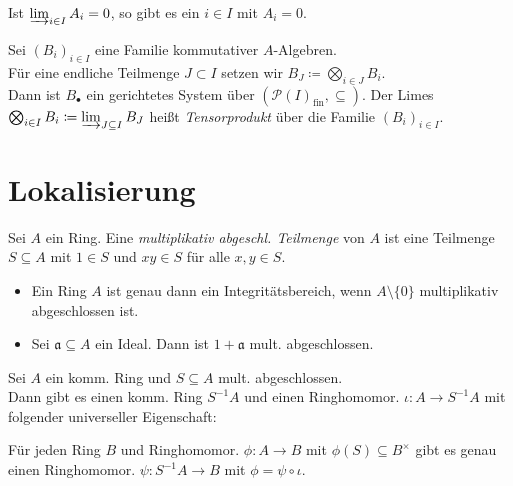 \documentclass{cheat-sheet}
\newcommand{\PS}{\mathcal{P}} %
\newcommand{\aaa}{\mathfrak{a}}
\begin{document}
\begin{prop}
  Ist $\varinjlim_{i \in I} A_i = 0$, so gibt es ein $i \in I$ mit $A_i = 0$.
\end{prop}

\begin{defn}
  Sei $(B_i)_{i \in I}$ eine Familie kommutativer $A$-Algebren. \\
  Für eine endliche Teilmenge $J \subset I$ setzen wir $B_J \coloneqq \bigotimes_{i \in J} B_i$. \\
  Dann ist $B_\bullet$ ein gerichtetes System über $(\PS(I)_{\text{fin}}, \subseteq)$.
  Der Limes $\bigotimes_{i \in I} B_i \coloneqq \varinjlim_{J \subseteq I} B_J$ heißt \emph{Tensorprodukt} über die Familie $(B_i)_{i \in I}$.
\end{defn}

\section{Lokalisierung}



\begin{defn}
  Sei $A$ ein Ring.
  Eine \emph{multiplikativ abgeschl. Teilmenge} von $A$ ist eine Teilmenge $S \subseteq A$ mit $1 \in S$ und $xy \in S$ für alle $x, y \in S$.
\end{defn}

\begin{bspe}
  \begin{itemize}
    \item Ein Ring $A$ ist genau dann ein Integritätsbereich, wenn $A \setminus \{ 0 \}$ multiplikativ abgeschlossen ist.
    \item Sei $\aaa \subseteq A$ ein Ideal. Dann ist $1 + \aaa$ mult. abgeschlossen.
  \end{itemize}
\end{bspe}

\begin{prop}
  Sei $A$ ein komm. Ring und $S \subseteq A$ mult. abgeschlossen. \\
  Dann gibt es einen komm. Ring $S^{-1} A$ und einen Ringhomomor. $\iota : A \to S^{-1} A$ mit folgender universeller Eigenschaft:
  
  \hfill\begin{minipage}{0.95 \linewidth}
    Für jeden Ring $B$ und Ringhomomor. $\phi : A \to B$ mit $\phi(S) \subseteq B^{\times}$ gibt es genau einen Ringhomomor. $\psi : S^{-1} A \to B$ mit $\phi = \psi \circ \iota$.
  \end{minipage}
\end{prop}
\end{document}
